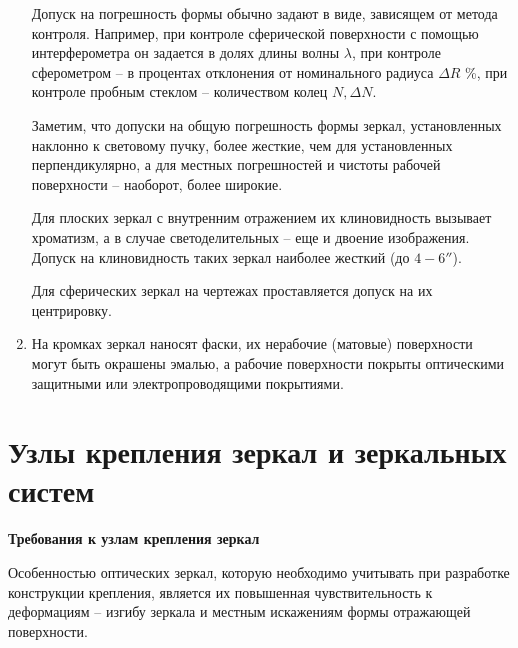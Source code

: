 \begin{enumerate}[leftmargin=*]
Допуск на погрешность формы обычно задают в виде, зависящем от метода контроля. Например, при контроле сферической поверхности с помощью интерферометра он задается в долях длины волны $ \lambda $, при контроле сферометром -- в процентах отклонения от номинального радиуса $ \Delta R $ \%, при контроле пробным стеклом -- количеством колец $ N, \Delta N $.

Заметим, что допуски на общую погрешность формы зеркал, установленных наклонно к световому пучку, более жесткие, чем для установленных перпендикулярно, а для местных погрешностей и чистоты рабочей поверхности -- наоборот, более широкие.

Для плоских зеркал с внутренним отражением их клиновидность вызывает хроматизм, а в случае светоделительных -- еще и двоение изображения. Допуск на клиновидность таких зеркал наиболее жесткий (до $ 4-6'' $).

Для сферических зеркал на чертежах проставляется допуск на их центрировку.

\item На кромках зеркал наносят фаски, их нерабочие (матовые) поверхности могут быть окрашены эмалью, а рабочие поверхности покрыты оптическими защитными или электропроводящими покрытиями.
\end{enumerate}


\section{Узлы крепления зеркал и зеркальных систем}

\begin{flushleft}
	\textbf{Требования к узлам крепления зеркал}
\end{flushleft}

Особенностью оптических зеркал, которую необходимо учитывать при разработке конструкции крепления, является их повышенная чувствительность к деформациям -- изгибу зеркала и местным искажениям формы отражающей поверхности. 

